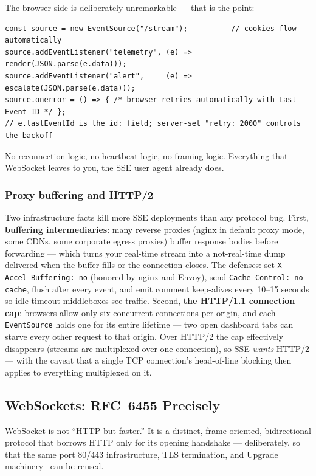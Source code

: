 \begin{examplebox}
The browser side is deliberately unremarkable --- that is the point:
\begin{verbatim}
const source = new EventSource("/stream");          // cookies flow automatically
source.addEventListener("telemetry", (e) => render(JSON.parse(e.data)));
source.addEventListener("alert",     (e) => escalate(JSON.parse(e.data)));
source.onerror = () => { /* browser retries automatically with Last-Event-ID */ };
// e.lastEventId is the id: field; server-set "retry: 2000" controls the backoff
\end{verbatim}
No reconnection logic, no heartbeat logic, no framing logic. Everything that
WebSocket leaves to you, the SSE user agent already does.
\end{examplebox}

\subsubsection{Proxy buffering and HTTP/2}

Two infrastructure facts kill more SSE deployments than any protocol bug.
First, \textbf{buffering intermediaries}: many reverse proxies (nginx in
default proxy mode, some CDNs, some corporate egress proxies) buffer response
bodies before forwarding --- which turns your real-time stream into a
not-real-time dump delivered when the buffer fills or the connection closes.
The defenses: set \texttt{X-Accel-Buffering: no} (honored by nginx and
Envoy), send \texttt{Cache-Control: no-cache}, flush after every event, and
emit comment keep-alives every 10--15 seconds so idle-timeout middleboxes see
traffic. Second, \textbf{the HTTP/1.1 connection cap}: browsers allow only
six concurrent connections per origin, and each \texttt{EventSource} holds
one for its entire lifetime --- two open dashboard tabs can starve every
other request to that origin. Over HTTP/2 the cap effectively disappears
(streams are multiplexed over one connection), so SSE \emph{wants} HTTP/2 ---
with the caveat that a single TCP connection's head-of-line blocking then
applies to everything multiplexed on it.

\subsection{WebSockets: RFC~6455 Precisely}
\label{sec:ch11-websockets}

WebSocket is not ``HTTP but faster.'' It is a distinct, frame-oriented,
bidirectional protocol that borrows HTTP only for its opening handshake ---
deliberately, so that the same port 80/443 infrastructure, TLS termination,
and Upgrade machinery~\cite{rfc9110} can be reused.

